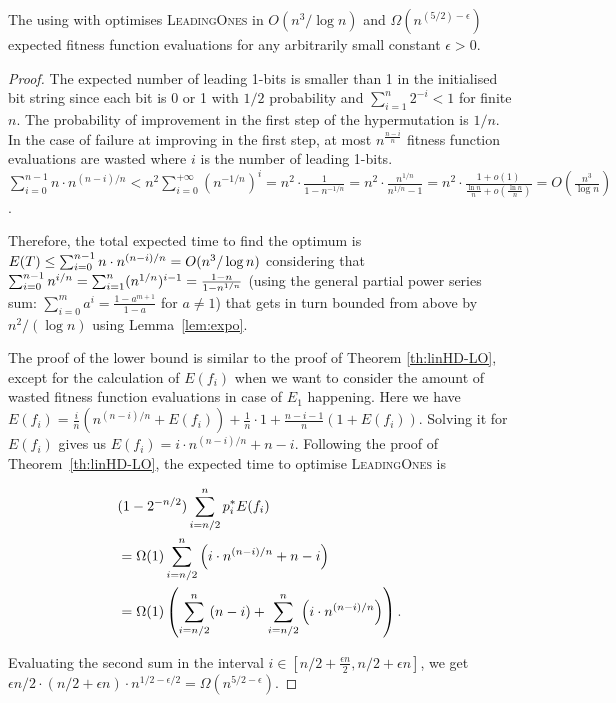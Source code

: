 \documentclass[lettersize,journal]{IEEEtran}
\begin{document}
\begin{theorem} \label{expohdOnLO}
The {\oneoneIA } using \IPHfcm{} with {\expoF } optimises \textsc{LeadingOnes} in $O(n^3/\log n)$ and 
$\Omega(n^{(5/2)-\epsilon})$  expected fitness function evaluations for any 
arbitrarily small constant $\epsilon>0$. 
\end{theorem}

\begin{proof}
{\color{black} The expected number of leading 1-bits is smaller than 1 in the initialised bit 
	string since each bit is 0 or 1 with $1/2$ probability and $\sum^{n}_{i=1}2^{-i}<1$ for finite $n$.} %
The probability of improvement in the first step {\color{black} of the hypermutation} is $1/n$. In the case of 
failure at improving in the first step, at most $n^{\frac{n-i}{n}}$ fitness 
function evaluations are wasted where $i$ is the number of leading 
1-bits. {\color{black}$\sum_{i = 0}^{n - 1} n \cdot n^{(n - i) / n} < n^2 \sum_{i = 0}^{+\infty}(n^{-1/n})^i = n^2 \cdot \frac{1}{1 - n^{-1/n}} = n^2 \cdot \frac{n^{1/n}}{n^{1/n} - 1} = n^2 \cdot \frac{1 + o(1)}{\frac{\ln{n}}{n} + o(\frac{\ln{n}}{n})} = O(\frac{n^3}{\log{n}})$. }

Therefore, the total expected time to find the optimum is  $E(T) \leq 
\sum_{{\color{black}i=0}}^{n-1} n \cdot n^{(n-i)/n}=O( n^3/\log n)$ considering that $ 
\sum_{{\color{black}i=0}}^{n-1} n^{i/n}= \sum_{{\color{black}i=1}}^n (n^{1/n})^{i-1}=\frac{1-n}{1-n^{1/n}}$ (using the general partial power series sum: $\sum_{i=0}^{m}a^{i}=\frac{1-a^{m+1}}{1-a}$ for $a\neq 1$)  that gets in turn bounded from above by $n^2/(\log n)$ using Lemma~\ref{lem:expo}.


The proof of the lower bound is similar to the proof of Theorem \ref{th:linHD-LO}, except for the calculation of $E(f_i)$ when we want to consider the amount of wasted fitness function evaluations in case of $E_1$ happening. Here we have $ E(f_i) = \frac{i}{n} \left( n^{(n-i)/n}+ E(f_i)\right) + \frac{1}{n} \cdot 1 +\frac{n-i-1}{n} \left( 1+ E(f_i)\right)$. Solving it for $E(f_i)$ gives us $E(f_i)=i\cdot n^{(n-i)/n}+n-i$. 
{\color{black}Following the proof of Theorem~\ref{th:linHD-LO}}, the expected time to optimise \textsc{LeadingOnes} is 

\begin{align*}
&(1-2^{-n/2})\sum_{i=n/2}^{n} {\color{black}p_{i}^{*}} E(f_i)\\
&=\Omega(1) \sum_{i=n/2}^{n} 
\left(i\cdot n^{(n-i)/n}+n-i \right)\\
&=\Omega(1)\left( \sum_{i=n/2}^{n} (n-i)+ 
\sum_{i=n/2}^{n} \left(i\cdot n^{(n-i)/n}\right)\right). 
\end{align*}

Evaluating the second 
sum in the interval $i\in [n/2+\frac{\epsilon n}{2}, n/2+\epsilon n]$, we get $\epsilon 
n/2 \cdot (n/2 + \epsilon n)  \cdot 
n^{1/2-\epsilon/2}=\Omega(n^{5/2-\epsilon})$.
\end{proof}
\end{document}
